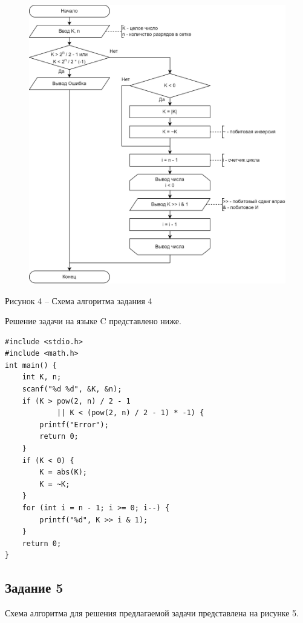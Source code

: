 \documentclass[a4paper,14pt]{extarticle}
\begin{document}
	\begin{figure}[h]
		\centering
		\includegraphics[width=0.8\linewidth]{schemes/s-4}
	\end{figure}
	\begin{center}
		Рисунок 4 – Схема алгоритма задания 4
	\end{center}
	\pagebreak
	
	Решение задачи на языке C представлено ниже.
	
	\begin{lstlisting}[tabsize=2,basicstyle=\ttfamily]
#include <stdio.h>
#include <math.h>
int main() {
	int K, n;
	scanf("%d %d", &K, &n);
	if (K > pow(2, n) / 2 - 1 
			|| K < (pow(2, n) / 2 - 1) * -1) {
		printf("Error");
		return 0;
	}
	if (K < 0) {
		K = abs(K);
		K = ~K;
	}
	for (int i = n - 1; i >= 0; i--) {
		printf("%d", K >> i & 1);
	}
	return 0;
}
	\end{lstlisting}
	
	\pagebreak
	\subsection*{Задание 5}
	Схема алгоритма для решения предлагаемой задачи представлена на рисунке 5.
	
\end{document}
